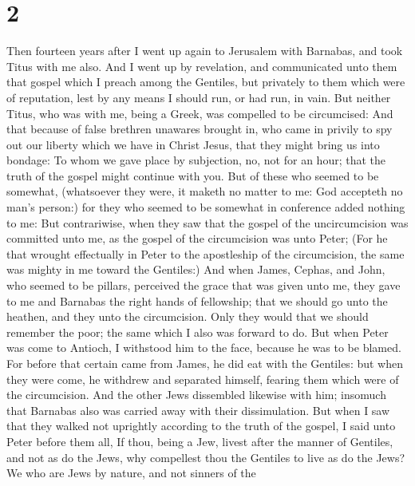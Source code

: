 \hypertarget{section-1}{%
\section{2}\label{section-1}}

 Then fourteen years after I went up again to Jerusalem with
Barnabas, and took Titus with me also.  And I went up by
revelation, and communicated unto them that gospel which I preach among
the Gentiles, but privately to them which were of reputation, lest by
any means I should run, or had run, in vain.  But neither
Titus, who was with me, being a Greek, was compelled to be circumcised:
 And that because of false brethren unawares brought in, who
came in privily to spy out our liberty which we have in Christ Jesus,
that they might bring us into bondage:  To whom we gave
place by subjection, no, not for an hour; that the truth of the gospel
might continue with you.  But of these who seemed to be
somewhat, (whatsoever they were, it maketh no matter to me: God
accepteth no man's person:) for they who seemed to be somewhat in
conference added nothing to me:  But contrariwise, when they
saw that the gospel of the uncircumcision was committed unto me, as the
gospel of the circumcision was unto Peter;  (For he that
wrought effectually in Peter to the apostleship of the circumcision, the
same was mighty in me toward the Gentiles:)  And when James,
Cephas, and John, who seemed to be pillars, perceived the grace that was
given unto me, they gave to me and Barnabas the right hands of
fellowship; that we should go unto the heathen, and they unto the
circumcision.  Only they would that we should remember the
poor; the same which I also was forward to do.  But when
Peter was come to Antioch, I withstood him to the face, because he was
to be blamed.  For before that certain came from James, he
did eat with the Gentiles: but when they were come, he withdrew and
separated himself, fearing them which were of the circumcision.
 And the other Jews dissembled likewise with him; insomuch
that Barnabas also was carried away with their dissimulation.
 But when I saw that they walked not uprightly according to
the truth of the gospel, I said unto Peter before them all, If thou,
being a Jew, livest after the manner of Gentiles, and not as do the
Jews, why compellest thou the Gentiles to live as do the Jews?
 We who are Jews by nature, and not sinners of the

